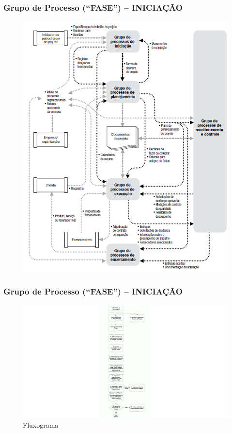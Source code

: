 \begin{frame}
   \frametitle{Grupo de Processo (“FASE”) – INICIAÇÃO}
   \begin{figure}
  \centering
  \includegraphics[height = 0.9\textheight]{figs/fig1_10.png}
 \end{figure}
\end{frame}
  
  \begin{frame}
   \frametitle{Grupo de Processo (“FASE”) – INICIAÇÃO}
   \begin{figure}
  \centering
  \includegraphics[height = 0.8\textheight]{figs/fig1_14.png}
  \caption{Fluxograma}
 \end{figure}
\end{frame}


